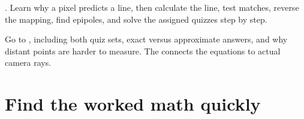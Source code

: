 \documentclass[letterpaper,11pt,english,openany,oneside]{jupyterBook}
\begin{document}
\sphinxAtStartPar
{} {\hyperref[\detokenize{lectures/lecture04/epipolar-practice::doc}]{}}. Learn why a pixel predicts a line, then calculate the line, test matches, reverse the mapping, find epipoles, and solve the assigned quizzes step by step.

\sphinxAtStartPar
{} Go to {\hyperref[\detokenize{lectures/lecture04/stereo:stereo-depth-sensitivity}]{}}, including both quiz sets, exact versus approximate answers, and why distant points are harder to measure. The {\hyperref[\detokenize{lectures/lecture04/stereo:stereo-explorer}]{}} connects the equations to actual camera rays.


\section{Find the worked math quickly}
\label{\detokenize{lectures/lecture04/index:find-the-worked-math-quickly}}
\end{document}
